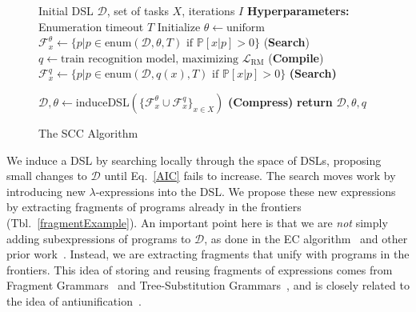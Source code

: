 \documentclass{article}
\newcommand{\system}{\textsc{SCC} }
\newcommand{\probability}{\mathds{P}} %
\begin{document}
\begin{figure}
  \begin{minipage}{0.6\textwidth}    
    \begin{algorithm}[H]
      \caption{The \system Algorithm}
      \label{mainAlgorithm}
      \begin{algorithmic}
         Initial DSL $\mathcal{D}$, set of tasks $X$, iterations $I$
        \STATE \textbf{Hyperparameters:} Enumeration timeout $T$
        \STATE Initialize $\theta\gets \text{uniform}$ %
        \STATE  $\mathcal{F}^{\theta}_x\gets \{p| p\in
        \text{enum}(\mathcal{D},\theta,T)\text{ if }\probability[x|p] > 0\}$
        \footnotesize{\hspace{0.1cm}(\textbf{Search})}
        \STATE $q\gets \text{train recognition model, maximizing }\mathcal{L}_{\text{RM}}$ \hspace{0.2cm}(\footnotesize{\textbf{Compile}})
        \STATE  $\mathcal{F}^{q}_x\gets\{p|p\in
        \text{enum}(\mathcal{D},q(x),T)\text{ if }\probability[x|p] > 0\}$
        \footnotesize{\hspace{0.15cm}\textbf{(Search)}}
        
        \STATE $\mathcal{D},\theta\gets $induceDSL$(\{\mathcal{F}^{\theta}_x\cup\mathcal{F}^{q}_x\}_{x\in X})$  \hspace{1.1cm} \footnotesize{\textbf{(Compress)}}
        \ENDFOR
        \STATE \textbf{return} $\mathcal{D},\theta,q$
      \end{algorithmic}
    \end{algorithm}
  \end{minipage}
\end{figure}%

We induce a DSL by searching locally through the space of DSLs,
proposing small changes to $\mathcal{D}$ until Eq.~\ref{AIC} fails to increase.
The search moves work by introducing new
$\lambda$-expressions into the DSL.
We propose these new expressions by extracting fragments of
programs already in the frontiers (Tbl.~\ref{fragmentExample}).
An important point here is that we are \emph{not} simply adding
subexpressions of programs to $\mathcal{D}$, as done in the EC algorithm~\cite{Dechter:2013:BLV:2540128.2540316} and other prior work~\cite{DBLP:conf/ecai/LinDETM14}.  Instead, we are
extracting fragments that unify with programs in the frontiers.  This
idea of storing and reusing fragments of expressions comes from
Fragment Grammars~\cite{tim} and Tree-Substitution
Grammars~\cite{cohn2010inducing}, and is closely related to the idea
of antiunification~\cite{henderson2013cumulative}.
\end{document}
